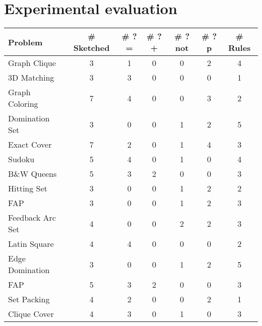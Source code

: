 \section{Experimental evaluation}\label{sec:experiments} 


\begin{table}[h] 
\centering
\footnotesize 
\begin{tabular}{l | c c c c c c}
\textbf{Problem} & \textbf{\# Sketched} &\textbf{\# ?=}& \textbf{\# ?+} & \textbf{\# ?not} &\textbf{\# ?p} & \textbf{\# Rules}\\\hline
Graph Clique            &        3              &   1  &  0    &    0    &   2   &    4    \\
3D Matching             &        3              &   3  &  0    &    0    &   0   &    1    \\
Graph Coloring          &        7              &   4  &  0    &    0    &   3   &    2    \\
Domination Set          &        3              &   0  &  0    &    1    &   2   &    5    \\
Exact Cover             &        7              &   2  &  0    &    1    &   4   &    3    \\
Sudoku                  &        5              &   4  &  0    &    1    &   0   &    4    \\
B\&W Queens             &        5              &   3  &  2    &    0    &   0   &    3    \\
Hitting Set             &        3              &   0  &  0    &    1    &   2   &    2    \\
FAP                     &        3              &   0  &  0    &    1    &   2   &    3    \\
Feedback Arc Set        &        4              &   0  &  0    &    2    &   2   &    3    \\
Latin Square            &        4              &   4  &  0    &    0    &   0   &    2    \\
Edge Domination         &        3              &   0  &  0    &    1    &   2   &    5    \\
FAP                     &        5              &   3  &  2    &    0    &   0   &    3    \\
Set Packing             &        4              &   2  &  0    &    0    &   2   &    1    \\
Clique Cover            &        4              &   3  &  0    &    1    &   0   &    3    \\

\end{tabular}
\end{table}
